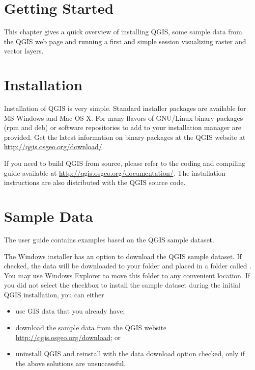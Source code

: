 
\section{Getting Started}\label{label_getstarted}


This chapter gives a quick overview of installing QGIS, some sample 
data from the QGIS web page and running a first and simple session 
visualizing raster and vector layers.

\section{Installation}\label{label_installation}

Installation of QGIS is very simple. Standard installer packages are
available for MS Windows and Mac OS X. For many flavors of GNU/Linux binary
packages (rpm and deb) or software repositories to add to your installation
manager are provided. Get the latest information on binary packages at the
QGIS website at \url{http://qgis.osgeo.org/download/}.


If you need to build QGIS from source, please refer to the coding and
compiling guide available at \url{http://qgis.osgeo.org/documentation/}. 
The installation instructions are also distributed with the QGIS source
code.

\section{Sample Data}\label{label_sampledata}

The user guide contains examples based on the QGIS sample dataset. 

\win The Windows installer has an option to download the QGIS sample dataset.
If checked, the data will be downloaded to your 
folder and placed in a folder called . 
You may use Windows Explorer to move this folder to any convenient location.
If you did not select the checkbox to install the sample dataset
during the initial QGIS installation, you can either
\begin{itemize}
\item use GIS data that you already have;
\item download the sample data from the QGIS website
 \url{http://qgis.osgeo.org/download}; or
\item uninstall QGIS and reinstall with the data download option checked, only if 
the above solutions are unsuccessful.
\end{itemize}

